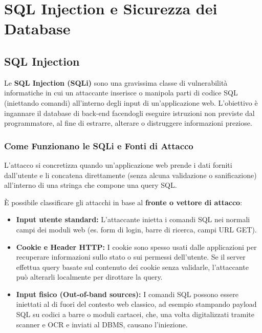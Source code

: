 \chapter{SQL Injection e Sicurezza dei Database}

\section{SQL Injection}

\begin{defbox}
Le \textbf{SQL Injection (SQLi)} sono una gravissima classe di vulnerabilità informatiche in cui un attaccante inserisce o manipola parti di codice SQL (iniettando comandi) all'interno degli input di un'applicazione web. L'obiettivo è ingannare il database di back-end facendogli eseguire istruzioni non previste dal programmatore, al fine di estrarre, alterare o distruggere informazioni preziose.
\end{defbox}

\subsection{Come Funzionano le SQLi e Fonti di Attacco}
L'attacco si concretizza quando un'applicazione web prende i dati forniti dall'utente e li concatena direttamente (senza alcuna validazione o sanificazione) all'interno di una stringa che compone una query SQL. 

È possibile classificare gli attacchi in base al \textbf{fronte o vettore di attacco}:
\begin{itemize}
    \item \textbf{Input utente standard:} L'attaccante inietta i comandi SQL nei normali campi dei moduli web (es. form di login, barre di ricerca, campi URL GET).
    \item \textbf{Cookie e Header HTTP:} I cookie sono spesso usati dalle applicazioni per recuperare informazioni sullo stato o sui permessi dell'utente. Se il server effettua query basate sul contenuto dei cookie senza validarle, l'attaccante può alterarli localmente per dirottare la query.
    \item \textbf{Input fisico (Out-of-band sources):} I comandi SQL possono essere iniettati al di fuori del contesto web classico, ad esempio stampando payload SQL su codici a barre o moduli cartacei, che, una volta digitalizzati tramite scanner e OCR e inviati al DBMS, causano l'iniezione.
\end{itemize}


